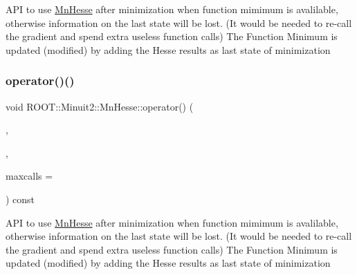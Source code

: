 A\+PI to use \mbox{\hyperlink{classROOT_1_1Minuit2_1_1MnHesse}{Mn\+Hesse}} after minimization when function mimimum is avalilable, otherwise information on the last state will be lost. (It would be needed to re-\/call the gradient and spend extra useless function calls) The Function Minimum is updated (modified) by adding the Hesse results as last state of minimization \mbox{\label{classROOT_1_1Minuit2_1_1MnHesse_a3b6ba68a41260029bc6bde433170e600}} 
\subsubsection{\texorpdfstring{operator()()}{operator()()}\hspace{0.1cm}{\footnotesize\ttfamily [21/24]}}
{\footnotesize\ttfamily void R\+O\+O\+T\+::\+Minuit2\+::\+Mn\+Hesse\+::operator() (\begin{DoxyParamCaption}\item[{const \mbox{\hyperlink{classROOT_1_1Minuit2_1_1FCNBase}{F\+C\+N\+Base}} \&}]{,  }\item[{\mbox{\hyperlink{classROOT_1_1Minuit2_1_1FunctionMinimum}{Function\+Minimum}} \&}]{,  }\item[{unsigned int}]{maxcalls = {} }\end{DoxyParamCaption}) const}

A\+PI to use \mbox{\hyperlink{classROOT_1_1Minuit2_1_1MnHesse}{Mn\+Hesse}} after minimization when function mimimum is avalilable, otherwise information on the last state will be lost. (It would be needed to re-\/call the gradient and spend extra useless function calls) The Function Minimum is updated (modified) by adding the Hesse results as last state of minimization \mbox{\label{classROOT_1_1Minuit2_1_1MnHesse_a4130de0190695811a4606f8ab229482d}} 
